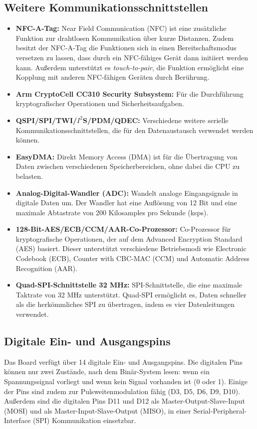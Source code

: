 \subsection{Weitere Kommunikationsschnittstellen}
\cite{Ard.2024}\cite{NrdSem3.2024}
\begin{itemize}
	\item \textbf{NFC-A-Tag:} Near Field Communication (NFC) ist eine zusätzliche Funktion zur drahtlosen Kommunikation über kurze Distanzen. Zudem besitzt der NFC-A-Tag die Funktionen sich in einen Bereitschaftsmodus versetzen zu lassen, dass durch ein NFC-fähiges Gerät dann initiiert werden kann. Außerdem unterstützt es \textit{touch-to-pair}, die Funktion ermöglicht eine Kopplung mit anderen NFC-fähigen Geräten durch Berührung.
	\item \textbf{Arm CryptoCell CC310 Security Subsystem:} Für die Durchführung kryptografischer Operationen und Sicherheitsaufgaben.\\ \cite{NrdSem.2024}
	\item \textbf{QSPI/SPI/TWI/$I^2$S/PDM/QDEC:} Verschiedene weitere serielle Kommunikationsschnittstellen, die für den Datenaustausch verwendet werden können.
	\item \textbf{EasyDMA:} Direkt Memory Access (DMA) ist für die Übertragung von Daten zwischen verschiedenen Speicherbereichen, ohne dabei die CPU zu belasten.\cite{Gehrke.2022}
	\item \textbf{Analog-Digital-Wandler (ADC):} Wandelt analoge Eingangsignale in digitale Daten um. Der Wandler hat eine Auflösung von 12 Bit und eine maximale Abtastrate von 200 Kilosamples pro Sekunde (ksps).
	\item \textbf{128-Bit-AES/ECB/CCM/AAR-Co-Prozessor:} Co-Prozessor für kryptografische Operationen, der auf dem Advanced Encryption Standard (AES) basiert. Dieser unterstützt verschiedene Betriebsmodi wie Electronic Codebook (ECB), Counter with CBC-MAC (CCM) und Automatic Address Recognition (AAR). \cite{NrdSem2.2024}
	\item \textbf{Quad-SPI-Schnittstelle 32 MHz:} SPI-Schnittstelle, die eine maximale Taktrate von 32 MHz unterstützt. Quad-SPI ermöglicht es, Daten schneller als die herkömmliches SPI zu übertragen, indem es vier Datenleitungen verwendet.\cite{NrdSem3.2023}
\end{itemize}

\subsection{Digitale Ein- und Ausgangspins}
Das Board verfügt über 14 digitale Ein- und Ausgangspins. Die digitalen Pins können nur zwei Zustände, nach dem Binär-System lesen: wenn ein Spannungssignal vorliegt und wenn kein Signal vorhanden ist (0 oder 1). Einige der Pins sind zudem zur Pulsweitenmodulation fähig (D3, D5, D6, D9, D10). Außerdem sind die digitalen Pins D11 und D12 als Master-Output-Slave-Input (MOSI) und als Master-Input-Slave-Output (MISO), in einer Serial-Peripheral-Interface (SPI) Kommunikation einsetzbar.\cite{Ard.2024}

